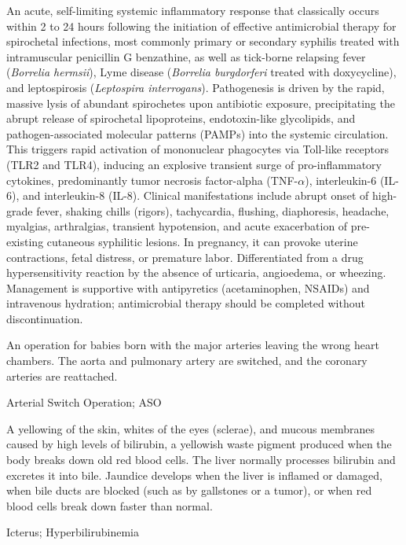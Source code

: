  An acute, self-limiting systemic inflammatory response that classically occurs within 2 to 24 hours following the initiation of effective antimicrobial therapy for spirochetal infections, most commonly primary or secondary syphilis treated with intramuscular penicillin G benzathine, as well as tick-borne relapsing fever (\textit{Borrelia hermsii}), Lyme disease (\textit{Borrelia burgdorferi} treated with doxycycline), and leptospirosis (\textit{Leptospira interrogans}). Pathogenesis is driven by the rapid, massive lysis of abundant spirochetes upon antibiotic exposure, precipitating the abrupt release of spirochetal lipoproteins, endotoxin-like glycolipids, and pathogen-associated molecular patterns (PAMPs) into the systemic circulation. This triggers rapid activation of mononuclear phagocytes via Toll-like receptors (TLR2 and TLR4), inducing an explosive transient surge of pro-inflammatory cytokines, predominantly tumor necrosis factor-alpha (TNF-$\alpha$), interleukin-6 (IL-6), and interleukin-8 (IL-8). Clinical manifestations include abrupt onset of high-grade fever, shaking chills (rigors), tachycardia, flushing, diaphoresis, headache, myalgias, arthralgias, transient hypotension, and acute exacerbation of pre-existing cutaneous syphilitic lesions. In pregnancy, it can provoke uterine contractions, fetal distress, or premature labor. Differentiated from a drug hypersensitivity reaction by the absence of urticaria, angioedema, or wheezing. Management is supportive with antipyretics (acetaminophen, NSAIDs) and intravenous hydration; antimicrobial therapy should be completed without discontinuation.

 An operation for babies born with the major arteries leaving the wrong heart chambers. The aorta and pulmonary artery are switched, and the coronary arteries are reattached.

\synonyms
Arterial Switch Operation; ASO

 A yellowing of the skin, whites of the eyes (sclerae), and mucous membranes caused by high levels of bilirubin, a yellowish waste pigment produced when the body breaks down old red blood cells. The liver normally processes bilirubin and excretes it into bile. Jaundice develops when the liver is inflamed or damaged, when bile ducts are blocked (such as by gallstones or a tumor), or when red blood cells break down faster than normal.

\synonyms
Icterus; Hyperbilirubinemia


